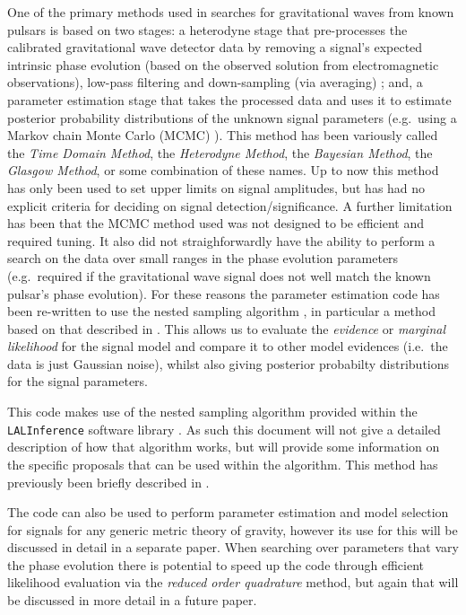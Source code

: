 \documentclass[aps,prd,showpacs,superscriptaddress,twocolumn,preprintnumbers,altaffilletter]{revtex4-1}
\newcommand{\gws}{gravitational waves\xspace}
\newcommand{\gw}{gravitational wave\xspace}
\newcommand{\lalinf}{\texttt{LALInference}\xspace}
\begin{document}
One of the primary methods used in searches for \gws from known pulsars is based on two stages: a heterodyne
stage that pre-processes the calibrated \gw detector data by removing a signal's expected intrinsic phase
evolution (based on the observed solution from electromagnetic observations), low-pass filtering and
down-sampling (via averaging) \cite{2005PhRvD..72j2002D}; and, a parameter estimation stage that takes the
processed data and uses it to estimate posterior probability distributions of the unknown signal parameters
(e.g.\ using a Markov chain Monte Carlo (MCMC) \cite{2010ApJ...713..671A}). This method has been variously
called the {\it Time Domain Method}, the {\it Heterodyne Method}, the {\it Bayesian Method}, the {\it Glasgow
Method}, or some combination of these names. Up to now this method has only been used to set upper limits
on signal amplitudes, but has had no explicit criteria for deciding on signal detection/significance. A further
limitation has been that the MCMC method used was not designed to be efficient and required tuning. It also
did not straighforwardly have the ability to perform a search on the data over small ranges in the phase
evolution parameters (e.g.\ required if the
\gw signal does not well match the known pulsar's phase evolution). For these reasons the parameter
estimation code has been re-written to use the nested sampling algorithm \cite{Skilling:2006}, in particular
a method based on that described in \cite{Veitch:2010}. This allows us to evaluate the {\it evidence} or {\it
marginal likelihood} for the signal model and compare it to other model evidences (i.e.\ the data is just
Gaussian noise), whilst also giving posterior probabilty distributions for the signal parameters.

This code makes use of the nested sampling algorithm provided within the \lalinf software library
\citep{2015PhRvD..91d2003V}. As such this document will not give a detailed description of how that algorithm
works, but will provide some information on the specific proposals that can be used within the algorithm.
This method has previously been briefly described in \cite{2012JPhCS.363a2041P}.

The code can also be used to perform parameter estimation and model selection for signals for any generic
metric theory of gravity, however its use for this will be discussed in detail in a separate paper. When
searching over parameters that vary the phase evolution there is potential to speed up the code through
efficient likelihood evaluation via the {\it reduced order quadrature} method, but again that will be
discussed in more detail in a future paper.
\end{document}
